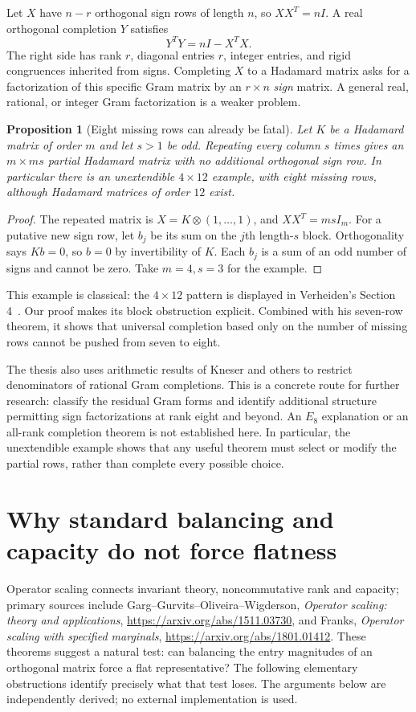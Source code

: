 \documentclass[11pt]{article}
\newtheorem{proposition}[theorem]{Proposition}
\begin{document}
Let $X$ have $n-r$ orthogonal sign rows of length $n$, so
$XX^T=nI$. A real orthogonal completion $Y$ satisfies
\[
 Y^TY=nI-X^TX.
\]
The right side has rank $r$, diagonal entries $r$, integer entries,
and rigid congruences inherited from signs. Completing $X$ to a
Hadamard matrix asks for a factorization of this specific Gram matrix
by an $r\times n$ \emph{sign} matrix. A general real, rational, or
integer Gram factorization is a weaker problem.

\begin{proposition}[Eight missing rows can already be fatal]
\label{prop:eight-defect}
Let $K$ be a Hadamard matrix of order $m$ and let $s>1$ be odd.
Repeating every column $s$ times gives an $m\times ms$ partial
Hadamard matrix with no additional orthogonal sign row.
In particular there is an unextendible $4\times12$ example, with
eight missing rows, although Hadamard matrices of order $12$ exist.
\end{proposition}
\begin{proof}
The repeated matrix is $X=K\otimes(1,\ldots,1)$, and
$XX^T=msI_m$. For a putative new sign row, let $b_j$ be its sum
on the $j$th length-$s$ block. Orthogonality says $Kb=0$, so $b=0$
by invertibility of $K$. Each $b_j$ is a sum of an odd number of
signs and cannot be zero. Take $m=4,s=3$ for the example.
\end{proof}
This example is classical: the $4\times12$ pattern is displayed
in Verheiden's Section 4~\cite{Verheiden}. Our proof makes its block
obstruction explicit. Combined with his seven-row theorem, it shows
that universal completion based only on the number of missing rows
cannot be pushed from seven to eight.

The thesis also uses arithmetic results of Kneser and others to
restrict denominators of rational Gram completions. This is a
concrete route for further research: classify the residual Gram
forms and identify additional structure permitting sign factorizations
at rank eight and beyond. An $E_8$ explanation or an all-rank
completion theorem is not established here. In particular, the
unextendible example shows that any useful theorem must select or
modify the partial rows, rather than complete every possible choice.
\section{Why standard balancing and capacity do not force flatness}
\label{sec:capacity-obstruction}

Operator scaling connects invariant theory, noncommutative rank and
capacity; primary sources include Garg--Gurvits--Oliveira--Wigderson,
\emph{Operator scaling: theory and applications},
\url{https://arxiv.org/abs/1511.03730}, and Franks,
\emph{Operator scaling with specified marginals},
\url{https://arxiv.org/abs/1801.01412}. These theorems suggest a natural
test: can balancing the entry magnitudes of an orthogonal matrix force
a flat representative? The following elementary obstructions identify
precisely what that test loses. The arguments below are independently
derived; no external implementation is used.
\end{document}
